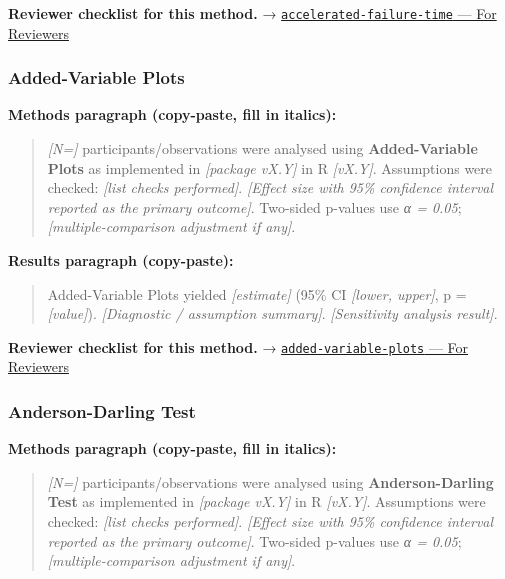 \documentclass[
]{article}
\begin{document}
\textbf{Reviewer checklist for this method.} →
\href{../chapters/11-survival/accelerated-failure-time.Rmd\#for-reviewers}{\texttt{accelerated-failure-time}
--- For Reviewers}

\subsubsection{Added-Variable Plots}\label{added-variable-plots}

\textbf{Methods paragraph (copy-paste, fill in italics):}

\begin{quote}
\emph{{[}N={]}} participants/observations were analysed using
\textbf{Added-Variable Plots} as implemented in \emph{{[}package
vX.Y{]}} in R \emph{{[}vX.Y{]}}. Assumptions were checked: \emph{{[}list
checks performed{]}}. \emph{{[}Effect size with 95\% confidence interval
reported as the primary outcome{]}}. Two-sided p-values use \emph{α =
0.05}; \emph{{[}multiple-comparison adjustment if any{]}}.
\end{quote}

\textbf{Results paragraph (copy-paste):}

\begin{quote}
Added-Variable Plots yielded \emph{{[}estimate{]}} (95\% CI
\emph{{[}lower, upper{]}}, p = \emph{{[}value{]}}). \emph{{[}Diagnostic
/ assumption summary{]}}. \emph{{[}Sensitivity analysis result{]}}.
\end{quote}

\textbf{Reviewer checklist for this method.} →
\href{../chapters/07-regression/added-variable-plots.Rmd\#for-reviewers}{\texttt{added-variable-plots}
--- For Reviewers}

\subsubsection{Anderson-Darling Test}\label{anderson-darling-test}

\textbf{Methods paragraph (copy-paste, fill in italics):}

\begin{quote}
\emph{{[}N={]}} participants/observations were analysed using
\textbf{Anderson-Darling Test} as implemented in \emph{{[}package
vX.Y{]}} in R \emph{{[}vX.Y{]}}. Assumptions were checked: \emph{{[}list
checks performed{]}}. \emph{{[}Effect size with 95\% confidence interval
reported as the primary outcome{]}}. Two-sided p-values use \emph{α =
0.05}; \emph{{[}multiple-comparison adjustment if any{]}}.
\end{quote}
\end{document}
